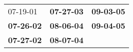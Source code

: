 \begin{supertabular}{p{0.33\columnwidth}p{0.33\columnwidth}p{0.33\columnwidth}}
          07-19-01\textsuperscript{} &  \textbf{07-27-03\textsuperscript{}} &  \textbf{09-03-05\textsuperscript{}} \\
 \textbf{07-26-02\textsuperscript{}} &  \textbf{08-06-04\textsuperscript{}} &  \textbf{09-04-05\textsuperscript{}} \\
 \textbf{07-27-02\textsuperscript{}} &  \textbf{08-07-04\textsuperscript{}} &                                      \\
\end{supertabular}
